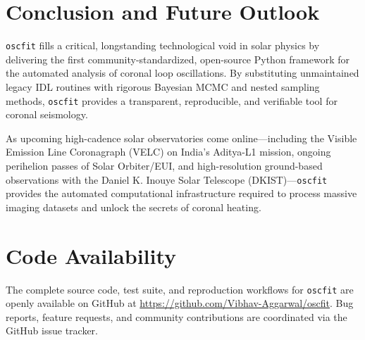 \documentclass[11pt,a4paper]{article}
\begin{document}
\section{Conclusion and Future Outlook}

\texttt{oscfit} fills a critical, longstanding technological void in solar physics by delivering the first community-standardized, open-source Python framework for the automated analysis of coronal loop oscillations. By substituting unmaintained legacy IDL routines with rigorous Bayesian MCMC and nested sampling methods, \texttt{oscfit} provides a transparent, reproducible, and verifiable tool for coronal seismology.

As upcoming high-cadence solar observatories come online---including the Visible Emission Line Coronagraph (VELC) on India's Aditya-L1 mission, ongoing perihelion passes of Solar Orbiter/EUI, and high-resolution ground-based observations with the Daniel K. Inouye Solar Telescope (DKIST)---\texttt{oscfit} provides the automated computational infrastructure required to process massive imaging datasets and unlock the secrets of coronal heating.

\section*{Code Availability}

The complete source code, test suite, and reproduction workflows for \texttt{oscfit} are openly available on GitHub at \url{https://github.com/Vibhav-Aggarwal/oscfit}. Bug reports, feature requests, and community contributions are coordinated via the GitHub issue tracker.



\end{document}
